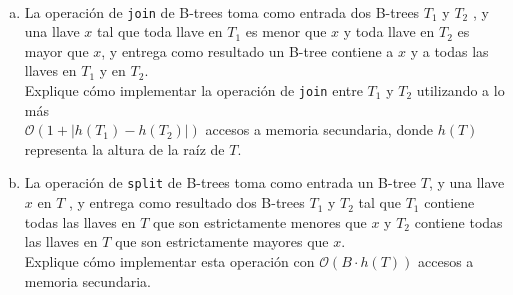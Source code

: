 \documentclass[dcc,uchile]{fcfmcourse}
\theoremstyle{plain}
\theoremstyle{definition}
\begin{document}
\begin{problems}
\\
\begin{enumerate}[a)]
    \item La operación de \texttt{join} de B-trees toma como entrada dos B-trees $T_1$ y $T_2$ , y una llave $x$ tal que toda llave en $T_1$ es menor que $x$ y toda llave en $T_2$ es mayor que $x$, y entrega como resultado un B-tree contiene a $x$ y a todas las llaves en $T_1$ y en $T_2$.\\
Explique cómo implementar la operación de \texttt{join} entre $T_1$ y $T_2$ utilizando a lo más\\ $\mathcal{O}(1 + |h(T_1) − h(T_2)|)$ accesos a memoria secundaria, donde $h(T)$ representa la altura de la raíz de $T$.
\item La operación de \texttt{split} de B-trees toma como entrada un B-tree $T$, y una
llave $x$ en $T$ , y entrega como resultado dos B-trees $T_1$ y $T_2$ tal que $T_1$ contiene todas las llaves en $T$ que son estrictamente menores que $x$ y $T_2$ contiene todas las llaves en $T$ que son estrictamente mayores que $x$.\\ Explique cómo implementar
esta operación con $\mathcal{O}(B\cdot h(T))$ accesos a memoria secundaria.
\end{enumerate}

\end{problems}
\end{document}
